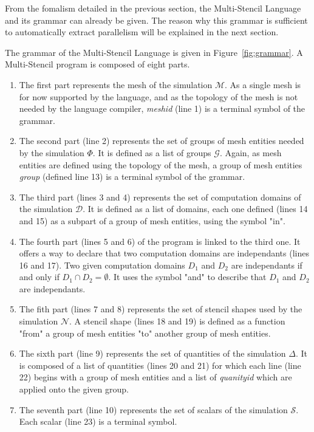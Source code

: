 From the fomalism detailed in the previous section, the Multi-Stencil Language and its grammar can already be given. The reason why this grammar is sufficient to automatically extract parallelism will be explained in the next section.

\medskip
The grammar of the Multi-Stencil Language is given in Figure~\ref{fig:grammar}. A Multi-Stencil program is composed of eight parts. 

\begin{enumerate}
\item The first part represents the mesh of the simulation $\mathcal{M}$. As a single mesh is for now supported by the language, and as the topology of the mesh is not needed by the language compiler, \textit{meshid} (line 1) is a terminal symbol of the grammar. 
\item The second part (line 2) represents the set of groups of mesh entities needed by the simulation $\Phi$. It is defined as a list of groups $\mathcal{G}$. Again, as mesh entities are defined using the topology of the mesh, a group of mesh entities \textit{group} (defined line 13) is a terminal symbol of the grammar.
\item The third part (lines 3 and 4) represents the set of computation domains of the simulation $\mathcal{D}$. It is defined as a list of domains, each one defined (lines 14 and 15) as a subpart of a group of mesh entities, using the symbol "in".
\item The fourth part (lines 5 and 6) of the program is linked to the third one. It offers a way to declare that two computation domains are independants (lines 16 and 17). Two given computation domains $D_1$ and $D_2$ are independants if and only if $D_1 \cap D_2 = \emptyset$. It uses the symbol "and" to describe that $D_1$ and $D_2$ are independants.
\item The fith part (lines 7 and 8) represents the set of stencil shapes used by the simulation $\mathcal{N}$. A stencil shape (lines 18 and 19) is defined as a function "from" a group of mesh entities "to" another group of mesh entities.
\item The sixth part (line 9) represents the set of quantities of the simulation $\Delta$. It is composed of a list of quantities (lines 20 and 21) for which each line (line 22) begins with a group of mesh entities and a list of \textit{quanityid} which are applied onto the given group.
\item The seventh part (line 10) represents the set of scalars of the simulation $\mathcal{S}$. Each scalar (line 23) is a terminal symbol.

\end{enumerate}
